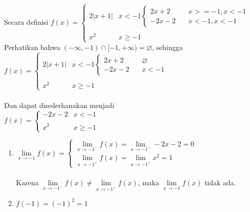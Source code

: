 \documentclass[10pt,openany,a4paper]{article}
\begin{document}
\begin{enumerate}
        Secara definisi $f(x)=\begin{cases}
        2|x+1|&   x < -1\begin{cases}
            2x+2&\quad x>=-1,x<-1\\
             -2x-2&\quad x<-1,x<-1
        \end{cases}\\
        \\
        x^2 &   x \geq -1
        \end{cases}$\\
        Perhatikan bahwa $(-\infty,-1)\cap[-1,+\infty)=\varnothing$, sehingga\\
        $f(x)=\begin{cases}
        2|x+1|&   x < -1\begin{cases}
            2x+2&\quad \varnothing\\
             -2x-2&\quad x<-1
        \end{cases}\\
        \\
        x^2 &   x \geq -1
        \end{cases}$\\~\\
        Dan dapat disederhanakan menjadi\\
        
        $f(x)=\begin{cases}
        -2x-2&   x < -1\\
        \\
        x^2 &   x \geq -1
        \end{cases}$
        \begin{enumerate}
            \item $\lim\limits_{x\to-1}f(x)=\begin{cases}
                    \lim\limits_{x\to-1^-}f(x)=\lim\limits_{x\to-1^-}-2x-2=0\\
                    \lim\limits_{x\to-1^+}f(x)=\lim\limits_{x\to-1^+}x^2=1
                \end{cases}$\\~\\
                Karena $\lim\limits_{x\to-1^-}f(x)\neq\lim\limits_{x\to-1^+}f(x)$, maka $\lim\limits_{x\to-1}f(x)$ tidak ada.\\

            \item $f(-1)=(-1)^2=1$\\
            

\end{enumerate}
\end{enumerate}
\end{document}
